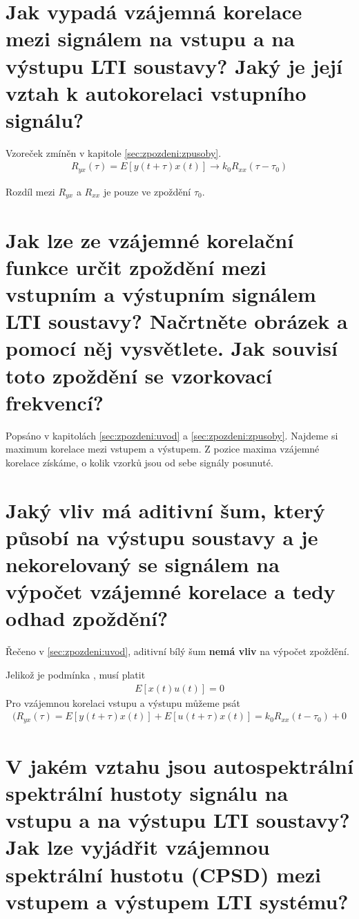 \documentclass[a4paper,12pt]{article}   %
\newcommand{\mt}[1]{$#1$}
\begin{document}
\section{Jak vypadá vzájemná korelace mezi signálem na vstupu a na výstupu LTI soustavy? Jaký je její vztah k autokorelaci vstupního signálu?}
Vzoreček zmíněn v kapitole \ref{sec:zpozdeni:zpusoby}.
\begin{align*}
        R_{yx}(\tau) = E[y(t+\tau)x(t)] \rightarrow k_0R_{xx}(\tau-\tau_0)
\end{align*}

Rozdíl mezi \mt{R_{yx}} a \mt{R_{xx}} je pouze ve zpoždění \mt{\tau_0}.


\section{Jak lze ze vzájemné korelační funkce určit zpoždění mezi vstupním a výstupním signálem LTI soustavy? Načrtněte obrázek a pomocí něj vysvětlete. Jak souvisí toto zpoždění se vzorkovací frekvencí?}
Popsáno v kapitolách \ref{sec:zpozdeni:uvod} a \ref{sec:zpozdeni:zpusoby}. Najdeme si maximum korelace mezi vstupem a výstupem. Z pozice maxima vzájemné korelace získáme, o kolik vzorků jsou od sebe signály posunuté.


\section{Jaký vliv má aditivní šum, který působí na výstupu soustavy a je nekorelovaný se signálem na výpočet vzájemné korelace a tedy odhad zpoždění?}
Řečeno v \ref{sec:zpozdeni:uvod}, aditivní bílý šum \textbf{nemá vliv} na výpočet zpoždění. 

Jelikož je podmínka , musí platit
\begin{align*}
        E[x(t)u(t)] = 0
\end{align*}
Pro vzájemnou korelaci vstupu a výstupu můžeme psát
\begin{align*}(
        R_{yx}(\tau) = E[y(t+\tau)x(t)] + E[u(t+\tau)x(t)] = k_0R_{xx}(t-\tau_0) + 0 
\end{align*}


\section{V jakém vztahu jsou autospektrální spektrální hustoty signálu na vstupu a na výstupu LTI soustavy? Jak lze vyjádřit vzájemnou spektrální hustotu (CPSD) mezi vstupem a výstupem LTI systému?} \label{sec:zpozdeni:SyxRyx}
\end{document}

